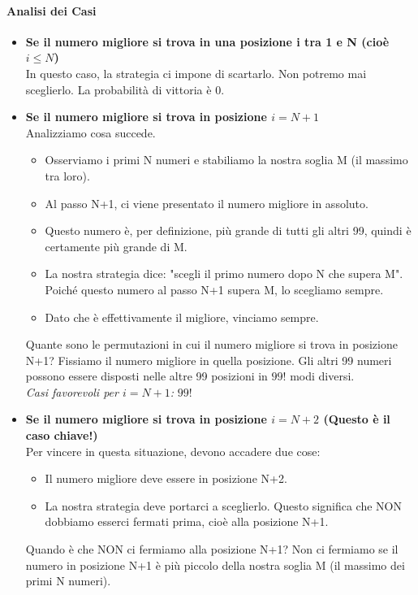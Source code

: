 \paragraph{Analisi dei Casi}
\begin{itemize}
    \item \textbf{Se il numero migliore si trova in una posizione i tra 1 e N (cioè $i \le N$)} \\
    In questo caso, la strategia ci impone di scartarlo. Non potremo mai sceglierlo. La probabilità di vittoria è 0.

    \item \textbf{Se il numero migliore si trova in posizione $i = N+1$} \\
    Analizziamo cosa succede.
    \begin{itemize}
        \item Osserviamo i primi N numeri e stabiliamo la nostra soglia M (il massimo tra loro).
        \item Al passo N+1, ci viene presentato il numero migliore in assoluto.
        \item Questo numero è, per definizione, più grande di tutti gli altri 99, quindi è certamente più grande di M.
        \item La nostra strategia dice: "scegli il primo numero dopo N che supera M". Poiché questo numero al passo N+1 supera M, lo scegliamo sempre.
        \item Dato che è effettivamente il migliore, vinciamo sempre.
    \end{itemize}
    Quante sono le permutazioni in cui il numero migliore si trova in posizione N+1? Fissiamo il numero migliore in quella posizione. Gli altri 99 numeri possono essere disposti nelle altre 99 posizioni in $99!$ modi diversi. \\
    \textit{Casi favorevoli per $i = N+1$:} $99!$

    \item \textbf{Se il numero migliore si trova in posizione $i = N+2$ (Questo è il caso chiave!)} \\
    Per vincere in questa situazione, devono accadere due cose:
    \begin{itemize}
        \item Il numero migliore deve essere in posizione N+2.
        \item La nostra strategia deve portarci a sceglierlo. Questo significa che NON dobbiamo esserci fermati prima, cioè alla posizione N+1.
    \end{itemize}
    Quando è che NON ci fermiamo alla posizione N+1? Non ci fermiamo se il numero in posizione N+1 è più piccolo della nostra soglia M (il massimo dei primi N numeri).
    

\end{itemize}
